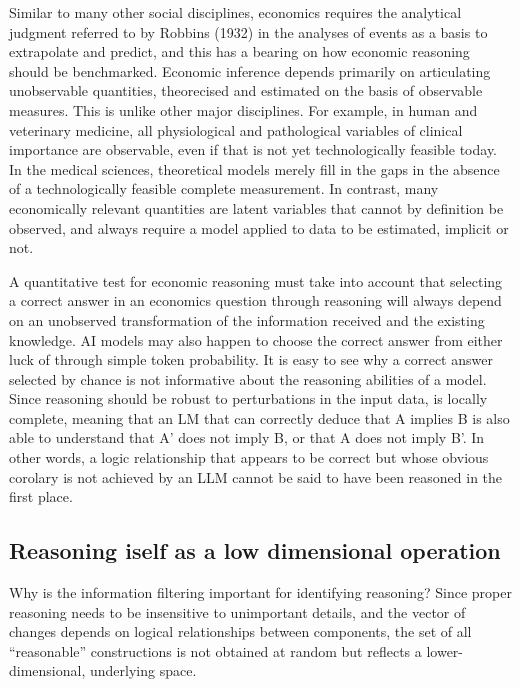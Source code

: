\documentclass[
]{article}
\begin{document}
Similar to many other social disciplines, economics requires the
analytical judgment referred to by Robbins (1932) in the analyses of
events as a basis to extrapolate and predict, and this has a bearing on
how economic reasoning should be benchmarked. Economic inference depends
primarily on articulating unobservable quantities, theorecised and
estimated on the basis of observable measures. This is unlike other
major disciplines. For example, in human and veterinary medicine, all
physiological and pathological variables of clinical importance are
observable, even if that is not yet technologically feasible today. In
the medical sciences, theoretical models merely fill in the gaps in the
absence of a technologically feasible complete measurement. In contrast,
many economically relevant quantities are latent variables that cannot
by definition be observed, and always require a model applied to data to
be estimated, implicit or not.

A quantitative test for economic reasoning must take into account that
selecting a correct answer in an economics question through reasoning
will always depend on an unobserved transformation of the information
received and the existing knowledge. AI models may also happen to choose
the correct answer from either luck of through simple token probability.
It is easy to see why a correct answer selected by chance is not
informative about the reasoning abilities of a model. Since reasoning
should be robust to perturbations in the input data, is locally
complete, meaning that an LM that can correctly deduce that A implies B
is also able to understand that A' does not imply B, or that A does not
imply B'. In other words, a logic relationship that appears to be
correct but whose obvious corolary is not achieved by an LLM cannot be
said to have been reasoned in the first place.

\subsection{Reasoning iself as a low dimensional
operation}\label{reasoning-iself-as-a-low-dimensional-operation}

Why is the information filtering important for identifying reasoning?
Since proper reasoning needs to be insensitive to unimportant details,
and the vector of changes depends on logical relationships between
components, the set of all ``reasonable'' constructions is not obtained
at random but reflects a lower-dimensional, underlying space.
\end{document}
